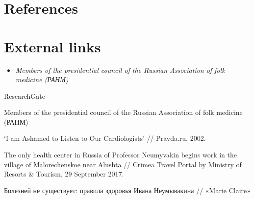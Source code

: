 \section{References}\label{references}

\section{External links}\label{external-links}

\begin{itemize}
\item
  \emph{Members of the presidential council of the Russian Association
  of folk medicine (РАНМ)}
\end{itemize}

ResearchGate

Members of the presidential council of the Russian Association of folk
medicine (РАНМ)

`I am Ashamed to Listen to Our Cardiologists' // Pravda.ru, 2002.

The only health center in Russia of Professor Neumyvakin begins work in
the village of Malorechenskoe near Alushta // Crimea Travel Portal by
Ministry of Resorts \& Tourism, 29 September 2017.

Болезней не существует: правила здоровья Ивана Неумывакина // «Marie
Claire»
